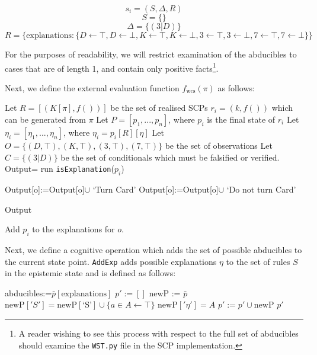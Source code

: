\[
s_i=(S,\Delta, R)
\]
\[
S=\{\}
\]
\[
\Delta=\{(3|D)\}
\]
\[
R=\{\text{explanations}:\{D\leftarrow \top, D \leftarrow \bot, K\leftarrow \top, K \leftarrow \bot, 3\leftarrow \top, 3 \leftarrow \bot, 7\leftarrow \top, 7\leftarrow \bot\}\}
\]

For the purposes of readability, we will restrict examination of the abducibles to cases that are of length 1, and contain only positive facts\footnote{A reader wishing to see this process with respect to the full set of abducibles should examine the \texttt{WST.py} file in the SCP implementation.}.

Next, we define the external evaluation function $f_\text{wcs}(\pi)$ as follows:

\begin{algorithm}[H] \label{cogOp:wcs}
\SetAlgoLined
{}
{
Let $R=[(K[\pi],f())]$ be the set of realised SCPs $r_i=(k,f())$ which can be generated from $\pi$\;
Let $P=[p_1,...,p_n]$, where $p_i$ is the final state of $r_i$\;
Let $\eta_i=[\eta_1,...,\eta_n]$, where $\eta_i=p_i[R][\eta]$\;
Let $O=\{(D,\top),(K,\top),(3,\top),(7,\top)\}$ be the set of observations\;
Let $C=\{(3|D)\}$ be the set of conditionals which must be falsified or verified.\;
Output={}\;
{
run \texttt{isExplanation}($p_i$)\;
}

{
{
Output[o]:=Output[o]$\cup$ `Turn Card'\;
}
\Else
{
Output[o]:=Output[o]$\cup$ `Do not turn Card'\;
}
}

\Return Output
}
{
{
Add $p_i$ to the explanations for $o$.
}
}

\caption{$\texttt{f}_\text{WST}$}
\end{algorithm}

Next, we define a cognitive operation which adds the set of possible abducibles to the current state point. \texttt{AddExp} adds possible explanations $\eta$ to the set of rules $S$ in the epistemic state and is defined as follows:

\begin{algorithm}[H] \label{cogOp:wcs}
\SetAlgoLined
{}
{
abducibles:=$\bar{p}[\text{explanations}]$\;
$p':=[]$\;
{
newP := $\bar{p}$\;
$\text{newP}['S']=\text{newP}[\text{`S'}] \cup \{a \in A\leftarrow \top\}$\;
$\text{newP}['\eta']=A$\;
$p':=p' \cup \text{newP}$\;
}
\Return $p'$
}

\caption{$\texttt{addExp}$}
\end{algorithm}






